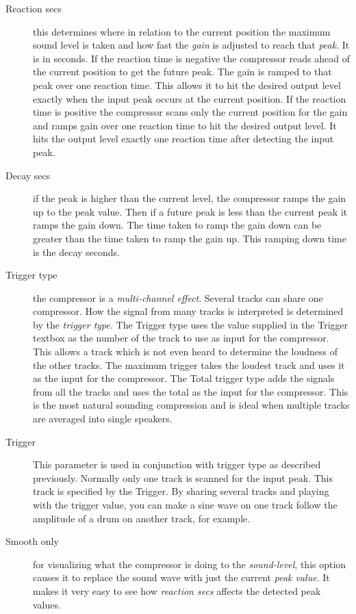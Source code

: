 \begin{description}
    \item[Reaction secs] this determines where in relation to the current position the maximum sound level is taken and how fast the \textit{gain} is adjusted to reach that \textit{peak}. It is in seconds. If the reaction time is negative the compressor reads ahead of the current position to get the future peak. The gain is ramped to that peak over one reaction time. This allows it to hit the desired output level exactly when the input peak occurs at the current position. If the reaction time is positive the compressor scans only the current position for the gain and ramps gain over one reaction time to hit the desired output level. It hits the output level exactly one reaction time after detecting the input peak.
    \item[Decay secs] if the peak is higher than the current level, the compressor ramps the gain up to the peak value. Then if a future peak is less than the current peak it ramps the gain down. The time taken to ramp the gain down can be greater than the time taken to ramp the gain up. This ramping down time is the decay seconds.
    \item[Trigger type] the compressor is a \textit{multi-channel effect}. Several tracks can share one compressor. How the signal from many tracks is interpreted is determined by the \textit{trigger type}. The Trigger type uses the value supplied in the Trigger textbox as the number of the track to use as input for the compressor. This allows a track which is not even heard to determine the loudness of the other tracks. The maximum trigger takes the loudest track and uses it as the input for the compressor. The Total trigger type adds the signals from all the tracks and uses the total as the input for the compressor. This is the most natural sounding compression and is ideal when multiple tracks are averaged into single speakers.
    \item[Trigger] This parameter is used in conjunction with trigger type as described previously. Normally only one track is scanned for the input peak. This track is specified by the Trigger. By sharing several tracks and playing with the trigger value, you can make a sine wave on one track follow the amplitude of a drum on another track, for example.
    \item[Smooth only] for visualizing what the compressor is doing to the \textit{sound-level}, this option causes it to replace the sound wave with just the current \textit{peak value}. It makes it very easy to see how \textit{reaction secs} affects the detected peak values.
\end{description}

